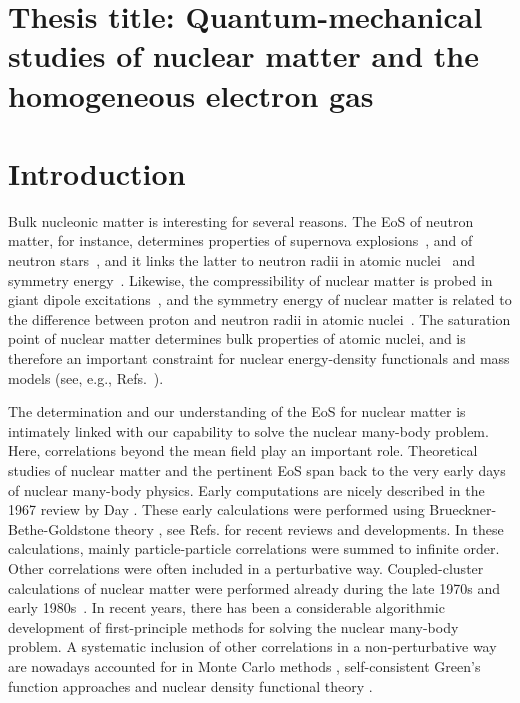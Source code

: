 \documentclass[aps,prc,twocolumn,showpacs,floatfix,nofootinbib,preprintnumbers,superscriptaddress,amsmath,amssymb]{revtex4-1}
\begin{document}
\pagestyle{plain}

\section*{Thesis title: Quantum-mechanical studies of nuclear matter and the homogeneous electron gas}


\section{Introduction}

Bulk nucleonic matter is interesting for several reasons. The EoS of
neutron matter, for instance, determines properties of supernova
explosions~\cite{burrows2013}, and of neutron
stars~\cite{weber1999,hh2000,lattimer2007,sammarruca2010,lattimer2012,hebeler2012f},
and it links the latter to neutron radii in atomic
nuclei~\cite{brown2000,horowitz2001,gandolfi2012} and symmetry
energy~\cite{tsang2012,steiner2012}. Likewise, the compressibility of
nuclear matter is probed in giant dipole
excitations~\cite{shlomo1993}, and the symmetry energy of nuclear
matter is related to the difference between proton and neutron radii
in atomic nuclei~\cite{abrahamyan2012,reinhard2013,erler2013}. The
saturation point of nuclear matter determines bulk properties of
atomic nuclei, and is therefore an important constraint for nuclear
energy-density functionals and mass models (see,
e.g., Refs.~\cite{kortelainen2010,lunney2003}).

The determination and our understanding of the EoS for nuclear matter
is intimately linked with our capability to solve the nuclear
many-body problem. Here, correlations beyond the mean field play an
important role.  Theoretical studies of nuclear matter and the
pertinent EoS span back to the very early days of nuclear many-body
physics. Early computations are nicely described in the 1967 review by
Day \cite{day1967}. These early calculations were performed using
Brueckner-Bethe-Goldstone theory \cite{brueckner1954,brueckner1955},
see Refs.\cite{hh2000,baldo2012,baldo2012a} for recent reviews and
developments.  In these calculations, mainly particle-particle
correlations were summed to infinite order.  Other correlations were
often included in a perturbative way. Coupled-cluster calculations of
nuclear matter were performed already during the late 1970s and early
1980s~\cite{kummel1978,day1981}. In recent years, there has been a
considerable algorithmic development of first-principle methods for
solving the nuclear many-body problem. A systematic inclusion of other
correlations in a non-perturbative way are nowadays accounted for in
Monte Carlo methods
\cite{carlson2003,gandolfi2009,gezerlis2010,lovato2012,gezerlis2013},
self-consistent Green's function approaches
\cite{dickhoff2004,soma2008, soma2012, baldo2012a,carbone2013} and
nuclear density functional theory \cite{lunney2003,erler2013}.
\end{document}
